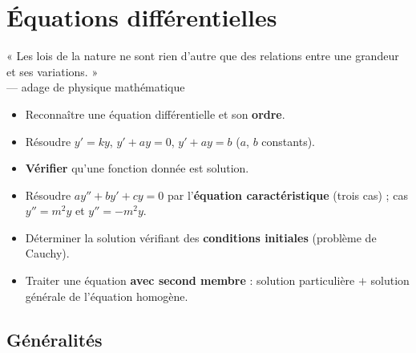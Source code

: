 
\chapter{Équations différentielles}

\begin{citationchapitre}
	« Les lois de la nature ne sont rien d'autre que des relations entre une
	grandeur et ses variations. »\\[0.4em]
	— adage de physique mathématique
\end{citationchapitre}

\begin{objectifs}
	\begin{itemize}[label=\textbullet]
		\item Reconnaître une équation différentielle et son \textbf{ordre}.
		\item Résoudre $y'=ky$, $y'+ay=0$, $y'+ay=b$ ($a$, $b$ constants).
		\item \textbf{Vérifier} qu'une fonction donnée est solution.
		\item Résoudre $ay''+by'+cy=0$ par l'\textbf{équation caractéristique}
		(trois cas) ; cas $y''=m^{2}y$ et $y''=-m^{2}y$.
		\item Déterminer la solution vérifiant des \textbf{conditions initiales}
		(problème de Cauchy).
		\item Traiter une équation \textbf{avec second membre} : solution
		particulière $+$ solution générale de l'équation homogène.
	\end{itemize}
\end{objectifs}


\section{Généralités}

